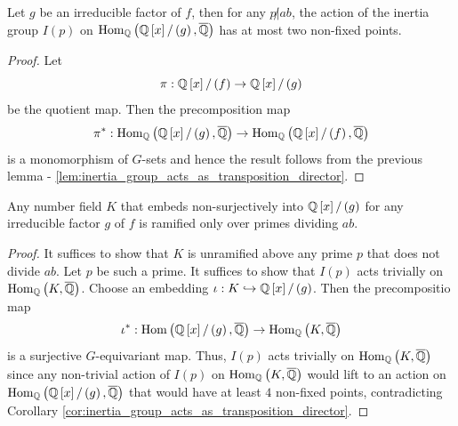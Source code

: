 \documentclass[../main.tex]{subfiles}
\begin{document}
\begin{corollary}
  \label{cor:inertia_group_acts_as_transposition_director}
  Let $g$ be an irreducible factor of $f$, then for any $p \not | ab$, the action of the inertia group $I\left( p \right)$ on $\operatorname{\rm Hom}_{\mathbb{Q}}\left( \mathbb{Q}\left[ x \right] / \left( g \right), \overline{\mathbb{Q}} \right)$ has at most two non-fixed points.
\end{corollary}
\begin{proof}
  Let 
  \[
    \pi: \mathbb{Q}\left[ x \right] / \left( f \right) \to \mathbb{Q}\left[ x \right] / \left( g \right)
  \]
  be the quotient map.
  Then the precomposition map 
  \[
    \pi^\ast : \operatorname{\rm Hom}_{\mathbb{Q}}\left( \mathbb{Q}\left[ x \right] / \left( g \right), \overline{\mathbb{Q}} \right) \to 
    \operatorname{\rm Hom}_{\mathbb{Q}}\left( \mathbb{Q}\left[ x \right] / \left( f \right), \overline{\mathbb{Q}} \right)
  \]
  is a monomorphism of $G$-sets and hence the result follows from the previous lemma - \ref{lem:inertia_group_acts_as_transposition_director}.
\end{proof}
\begin{corollary}
  \label{cor:ramification_only_over_primes_dividing_a}
  Any number field $K$ that embeds non-surjectively into $\mathbb{Q}\left[ x \right] / \left( g \right)$ for any irreducible factor $g$ of $f$ is ramified only over primes dividing $a b$.
\end{corollary}
\begin{proof}
  It suffices to show that $K$ is unramified above any prime $p$ that does not divide $a b$.
  Let $p$ be such a prime.
  It suffices to show that $I\left( p \right)$ acts trivially on $\operatorname{\rm Hom}_{\mathbb{Q}}\left( K, \overline{\mathbb{Q}} \right)$.
  Choose an embedding $\iota: K \hookrightarrow \mathbb{Q}\left[ x \right] / \left( g \right)$.
  Then the precompositio map 
  \[
    \iota^\ast : \operatorname{\rm Hom}\left( \mathbb{Q}\left[ x \right] / \left( g \right), \overline{\mathbb{Q}} \right) \to 
    \operatorname{\rm Hom}_{\mathbb{Q}}\left( K, \overline{\mathbb{Q}} \right)
  \]
  is a surjective $G$-equivariant map.
  Thus, $I\left( p \right)$ acts trivially on $\operatorname{\rm Hom}_{\mathbb{Q}}\left( K, \overline{\mathbb{Q}} \right)$ since any non-trivial action of $I\left( p \right)$ on $\operatorname{\rm Hom}_{\mathbb{Q}}\left( K, \overline{\mathbb{Q}} \right)$ would lift to an action on $\operatorname{\rm Hom}_{\mathbb{Q}}\left( \mathbb{Q}\left[ x \right] / \left( g \right), \overline{\mathbb{Q}} \right)$ that would have at least $4$ non-fixed points, contradicting Corollary \ref{cor:inertia_group_acts_as_transposition_director}.
\end{proof}
\end{document}
